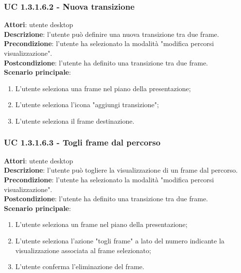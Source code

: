 \subsubsection{UC 1.3.1.6.2 - Nuova transizione}{
	\label{uc1.3.1.6.2}
	\textbf{Attori}: utente desktop \\
	\textbf{Descrizione}: l'utente può definire una nuova transizione tra due frame. \\
	\textbf{Precondizione}: l'utente ha selezionato la modalità "modifica percorsi visualizzazione".	\\
	\textbf{Postcondizione}: l'utente ha definito una transizione tra due frame.	\\
	\textbf{Scenario principale}:
	\begin{enumerate}
		\item L'utente seleziona una frame nel piano della presentazione;
		\item L'utente seleziona l'icona "aggiungi transizione";
		\item L'utente seleziona il frame destinazione.
	\end{enumerate}
}
\subsubsection{UC 1.3.1.6.3 - Togli frame dal percorso}{
	\label{uc1.3.1.6.3}
	\textbf{Attori}: utente desktop \\
	\textbf{Descrizione}: l'utente può togliere la visualizzazione di un frame dal percorso. \\
	\textbf{Precondizione}: l'utente ha selezionato la modalità "modifica percorsi visualizzazione".	\\
	\textbf{Postcondizione}: l'utente ha definito una transizione tra due frame.	\\
	\textbf{Scenario principale}:
	\begin{enumerate}
		\item L'utente seleziona un frame nel piano della presentazione;
		\item L'utente seleziona l'azione "togli frame" a lato del numero indicante la visualizzazione associata al frame selezionato;
		\item L'utente conferma l'eliminazione del frame.
	\end{enumerate}
}
